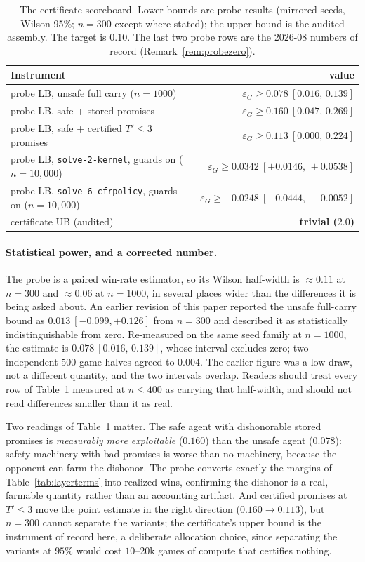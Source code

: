 \documentclass[11pt]{article}
\theoremstyle{plain}
\theoremstyle{definition}
\theoremstyle{remark}
\newcommand{\code}[1]{\texttt{\small #1}}
\newcommand{\game}{\ensuremath{G}}
\newcommand{\epsG}{\ensuremath{\varepsilon_{\game}}}
\begin{document}
\begin{table}[ht]
\centering
\caption{The certificate scoreboard. Lower bounds are probe results
(mirrored seeds, Wilson 95\%; $n=300$ except where stated); the upper
bound is the audited assembly. The target is $0.10$. The last two
probe rows are the 2026-08 numbers of record
(Remark~\ref{rem:probezero}).}
\label{tab:sandwich}
\small
\begin{tabular}{@{}lr@{}}
\toprule
Instrument & value\\
\midrule
probe LB, unsafe full carry ($n{=}1000$) & $\epsG \ge 0.078\ [0.016,\,0.139]$\\
probe LB, safe + stored promises & $\epsG \ge 0.160\ [0.047,\,0.269]$\\
probe LB, safe + certified $T'\le3$ promises & $\epsG \ge 0.113\ [0.000,\,0.224]$\\
probe LB, \code{solve-2-kernel}, guards on ($n{=}10{,}000$) & $\epsG \ge 0.0342\ [+0.0146,\,+0.0538]$\\
probe LB, \code{solve-6-cfrpolicy}, guards on ($n{=}10{,}000$) & $\epsG \ge -0.0248\ [-0.0444,\,-0.0052]$\\
certificate UB (audited) & \textbf{trivial ($2.0$)}\\
\bottomrule
\end{tabular}
\end{table}

\paragraph{Statistical power, and a corrected number.} The probe is a
paired win-rate estimator, so its Wilson half-width is
$\approx0.11$ at $n=300$ and $\approx0.06$ at $n=1000$, in several
places wider than the differences it is being asked about. An earlier
revision of this paper reported the unsafe full-carry bound as
$0.013\ [-0.099,+0.126]$ from $n=300$ and described it as
statistically indistinguishable from zero. Re-measured on the same seed
family at $n=1000$, the estimate is $0.078\ [0.016,\,0.139]$, whose
interval excludes zero; two independent $500$-game halves agreed to
$0.004$. The earlier figure was a low draw, not a different quantity,
and the two intervals overlap. Readers should treat every row of
Table~\ref{tab:sandwich} measured at $n\le400$ as carrying that
half-width, and should not read differences smaller than it as real.

Two readings of Table~\ref{tab:sandwich} matter. The safe agent with
dishonorable stored promises is \emph{measurably more exploitable}
($0.160$) than the unsafe agent ($0.078$): safety machinery with bad
promises is worse than no machinery, because the opponent can farm the
dishonor. The probe converts exactly the margins of
Table~\ref{tab:layerterms} into realized wins, confirming the dishonor
is a real, farmable quantity rather than an accounting artifact. And
certified promises at $T'\le3$ move the point estimate in the right
direction ($0.160\to0.113$), but $n=300$ cannot separate the variants;
the certificate's upper bound is the instrument of record here, a
deliberate allocation choice, since separating the variants at $95\%$
would cost $10$--$20$k games of compute that certifies nothing.
\end{document}
